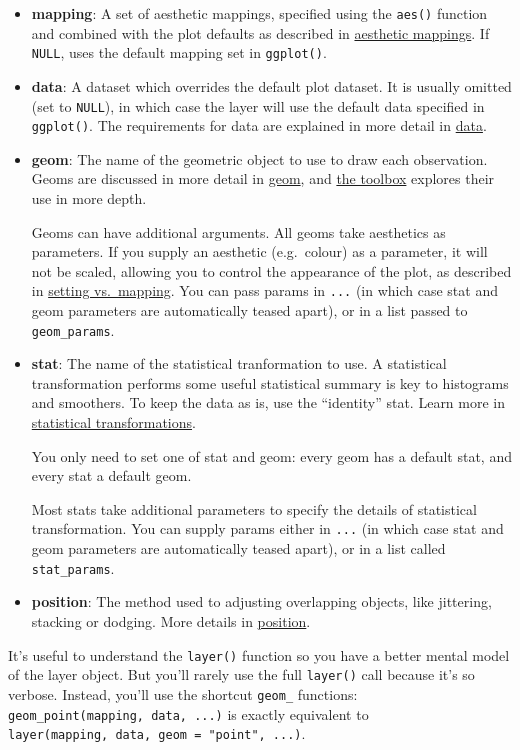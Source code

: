 \begin{itemize}
\item
  \textbf{mapping}: A set of aesthetic mappings, specified using the
  \texttt{aes()} function and combined with the plot defaults as
  described in \hyperref[sec:aes]{aesthetic mappings}. If \texttt{NULL},
  uses the default mapping set in \texttt{ggplot()}.
\item
  \textbf{data}: A dataset which overrides the default plot dataset. It
  is usually omitted (set to \texttt{NULL}), in which case the layer
  will use the default data specified in \texttt{ggplot()}. The
  requirements for data are explained in more detail in
  \hyperref[sec:data]{data}.
\item
  \textbf{geom}: The name of the geometric object to use to draw each
  observation. Geoms are discussed in more detail in
  \hyperref[sec:data]{geom}, and \hyperref[cha:toolbox]{the toolbox}
  explores their use in more depth.

  Geoms can have additional arguments. All geoms take aesthetics as
  parameters. If you supply an aesthetic (e.g.~colour) as a parameter,
  it will not be scaled, allowing you to control the appearance of the
  plot, as described in \hyperref[sub:setting-mapping]{setting
  vs.~mapping}. You can pass params in \texttt{...} (in which case stat
  and geom parameters are automatically teased apart), or in a list
  passed to \texttt{geom\_params}.
\item
  \textbf{stat}: The name of the statistical tranformation to use. A
  statistical transformation performs some useful statistical summary is
  key to histograms and smoothers. To keep the data as is, use the
  ``identity'' stat. Learn more in \hyperref[sec:stat]{statistical
  transformations}.

  You only need to set one of stat and geom: every geom has a default
  stat, and every stat a default geom.

  Most stats take additional parameters to specify the details of
  statistical transformation. You can supply params either in
  \texttt{...} (in which case stat and geom parameters are automatically
  teased apart), or in a list called \texttt{stat\_params}.
\item
  \textbf{position}: The method used to adjusting overlapping objects,
  like jittering, stacking or dodging. More details in
  \hyperref[sec:position]{position}.
\end{itemize}

It's useful to understand the \texttt{layer()} function so you have a
better mental model of the layer object. But you'll rarely use the full
\texttt{layer()} call because it's so verbose. Instead, you'll use the
shortcut \texttt{geom\_} functions:
\texttt{geom\_point(mapping,\ data,\ ...)} is exactly equivalent to
\texttt{layer(mapping,\ data,\ geom\ =\ "point",\ ...)}.


